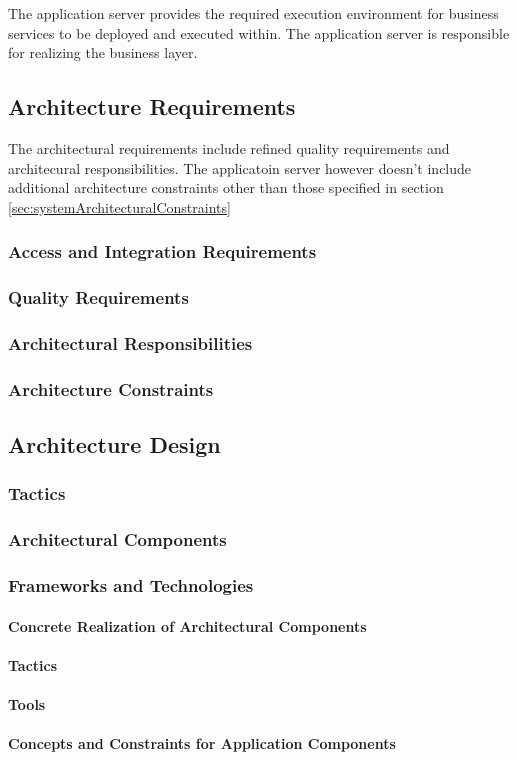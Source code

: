 The application server provides the required execution environment for business
services to be deployed and executed within. The application server is responsible
for realizing the business layer.

\subsection{Architecture Requirements}
The architectural requirements include refined quality requirements and architecural
responsibilities. The applicatoin server however doesn't include additional
architecture constraints other than those specified in section \ref{sec:systemArchitecturalConstraints}

\subsubsection{Access and Integration Requirements}
\subsubsection{Quality Requirements}
\subsubsection{Architectural Responsibilities}
\subsubsection{Architecture Constraints}
\subsection{Architecture Design}
\subsubsection{Tactics}
\subsubsection{Architectural Components}
\subsubsection{Frameworks and Technologies}
\paragraph{Concrete Realization of Architectural Components}
\paragraph{Tactics}
\paragraph{Tools}
\paragraph{Concepts and Constraints for Application Components}